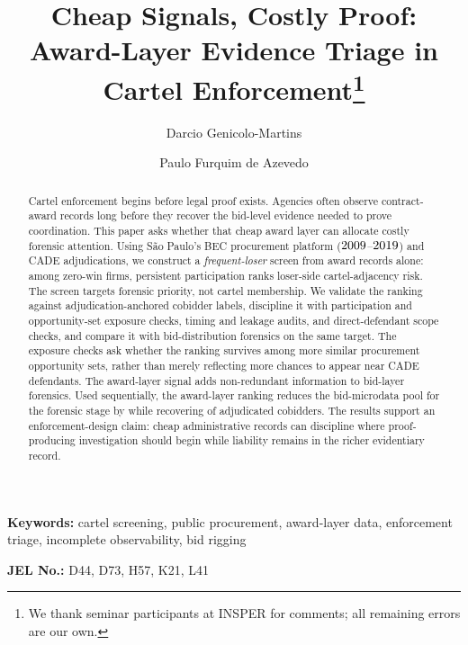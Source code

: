 \begin{frontmatter}

\title{Cheap Signals, Costly Proof: Award-Layer Evidence Triage in Cartel Enforcement\texorpdfstring{\footnote{We thank seminar participants at INSPER for comments; all remaining errors are our own.}}{}}

\author[insper]{Darcio Genicolo-Martins}
\author[insper]{Paulo Furquim de Azevedo}

\begin{abstract}
Cartel enforcement begins before legal proof exists. Agencies
often observe contract-award records long before they recover
the bid-level evidence needed to prove coordination. This paper
asks whether that cheap award layer can allocate costly
forensic attention. Using S\~ao Paulo's BEC procurement platform
($2009$--$2019$) and CADE adjudications, we
construct a \emph{frequent-loser} screen from award records
alone: among zero-win firms, persistent participation ranks
loser-side cartel-adjacency risk. The screen targets forensic
priority, not cartel membership. We validate the ranking against
adjudication-anchored cobidder labels, discipline it with
participation and opportunity-set exposure checks, timing and
leakage audits, and direct-defendant scope checks, and compare
it with bid-distribution forensics on the same target. The
exposure checks ask whether the ranking survives among more
similar procurement opportunity sets, rather than merely
reflecting more chances to appear near CADE defendants. The
award-layer signal adds non-redundant information to bid-layer
forensics. Used sequentially, the award-layer ranking
reduces the bid-microdata pool for the forensic stage by \valGateFootprintPct
while recovering \valGateSeqKTwoKOneTPIn{} of \valCobidders{} adjudicated cobidders. The results
support an enforcement-design claim: cheap administrative
records can discipline where proof-producing investigation
should begin while liability remains in the richer evidentiary
record.
\end{abstract}

\end{frontmatter}

\noindent\textbf{Keywords:} cartel screening, public procurement, award-layer data, enforcement triage, incomplete observability, bid rigging

\noindent\textbf{JEL No.:} D44, D73, H57, K21, L41

\bigskip
